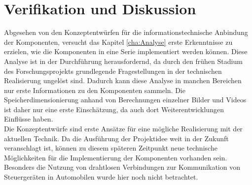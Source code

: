 \chapter{Verifikation und Diskussion}
\label{cha:Verifikation}
Abgesehen von den Konzeptentwürfen für die informationstechnische Anbindung der Komponenten, versucht das Kapitel \ref{cha:Analyse} erste Erkenntnisse zu erzielen, wie die Komponenten in eine Serie implementiert werden können. Diese Analyse ist in der Durchführung herausfordernd, da durch den frühen Stadium des Forschungsprojekts grundlegende Fragestellungen in der technischen Realisierung ungelöst sind. Dadurch kann diese Analyse in manchen Bereichen nur erste Informationen zu den Komponenten sammeln. Die Speicherdimensionierung anhand von Berechnungen einzelner Bilder und Videos ist daher nur eine erste Einschätzung, da auch dort Weiterentwicklungen Einflüsse haben. \\
Die Konzeptentwürfe sind erste Ansätze für eine mögliche Realisierung mit der aktuellen Technik. Da die Ausführung der Projektidee weit in der Zukunft veranschlagt ist, können zu diesem späteren Zeitpunkt neue technische Möglichkeiten für die Implementierung der Komponenten vorhanden sein. Besonders die Nutzung von drahtlosen Verbindungen zur Kommunikation von Steuergeräten in Automobilen wurde hier noch nicht betrachtet. \\

